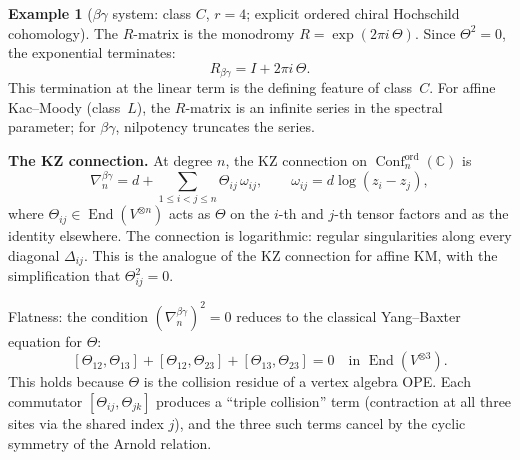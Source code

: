 \documentclass[11pt,reqno]{amsart}
\theoremstyle{definition}
\newtheorem{example}[theorem]{Example}
\theoremstyle{remark}
\DeclareMathOperator{\End}{End}
\DeclareMathOperator{\Conf}{Conf}
\newcommand{\CC}{\mathbb{C}}
\numberwithin{equation}{section}
\begin{document}
\begin{example}[$\beta\gamma$ system: class $C$, $r = 4$;
explicit ordered chiral Hochschild cohomology]
The $R$-matrix is the monodromy $R = \exp(2\pi i\,\Theta)$.
Since $\Theta^2 = 0$, the exponential terminates:
\begin{equation}\label{eq:bg-rmatrix}
  R_{\beta\gamma} = I + 2\pi i\,\Theta.
\end{equation}
This termination at the linear term is the defining feature
of class~$C$. For affine Kac--Moody (class~$L$), the
$R$-matrix is an infinite series in the spectral parameter;
for $\beta\gamma$, nilpotency truncates the series.

\medskip
\noindent
\textbf{The KZ connection.}
At degree $n$, the KZ connection on
$\Conf_n^{\mathrm{ord}}(\CC)$ is
\begin{equation}\label{eq:kz-bg}
  \nabla_n^{\beta\gamma}
  = d + \sum_{1 \leq i < j \leq n}
  \Theta_{ij}\, \omega_{ij}, \qquad
  \omega_{ij} = d\log(z_i - z_j),
\end{equation}
where $\Theta_{ij} \in \End(V^{\otimes n})$ acts as $\Theta$
on the $i$-th and $j$-th tensor factors and as the identity
elsewhere. The connection is logarithmic: regular singularities
along every diagonal $\Delta_{ij}$. This is the analogue of
the KZ connection for affine KM, with the simplification
that $\Theta_{ij}^2 = 0$.

Flatness: the condition $(\nabla_n^{\beta\gamma})^2 = 0$
reduces to the classical Yang--Baxter equation for $\Theta$:
\begin{equation}\label{eq:cybe-bg}
  [\Theta_{12}, \Theta_{13}]
  + [\Theta_{12}, \Theta_{23}]
  + [\Theta_{13}, \Theta_{23}] = 0
  \quad \text{in } \End(V^{\otimes 3}).
\end{equation}
This holds because $\Theta$ is the collision residue of a
vertex algebra OPE. Each commutator
$[\Theta_{ij}, \Theta_{jk}]$ produces a ``triple collision''
term (contraction at all three sites via the shared index $j$),
and the three such terms cancel by the cyclic symmetry
of the Arnold relation.


\end{example}
\end{document}

